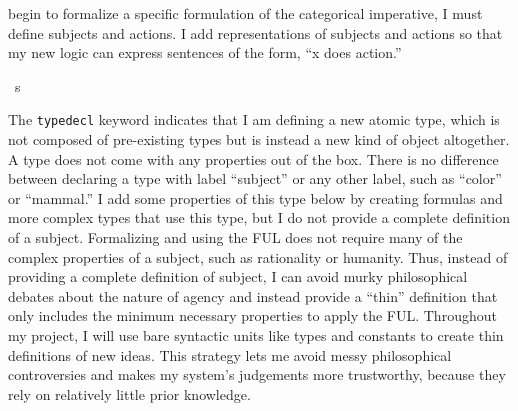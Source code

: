 \begin{isabellebody}
\begin{isamarkuptext}
begin to formalize a specific formulation of the categorical imperative, I must define
subjects and actions. I add representations of subjects and actions so that my new logic can express
sentences of the form, ``x does action.''%
\end{isamarkuptext}\isamarkuptrue%
\isamarkupfalse%
\ s\ %
%
\begin{isamarkuptext}%
The \texttt{typedecl} keyword indicates that I am defining a new atomic type, which is not composed
of pre-existing types but is instead a new kind of object altogether. A type does not come with any 
properties out of the box. There is no difference between declaring a type with label ``subject'' or any other
label, such as ``color'' or ``mammal.'' I add some properties of this type below by creating formulas
and more complex types that use this type, but I do not provide a complete definition of a subject.
Formalizing and using the FUL does not require many of the complex properties of a subject, such as 
rationality or humanity. Thus, instead of providing a complete definition of subject, I can avoid murky
philosophical debates about the nature of agency and instead provide a 
``thin'' definition that only includes the minimum necessary properties to apply the FUL. Throughout my 
project, I will use bare syntactic units like types and constants to create thin definitions of new ideas.
This strategy lets me avoid messy philosophical controversies and makes my system's judgements more 
trustworthy, because they rely on relatively little prior knowledge.


\end{isamarkuptext}
\end{isabellebody}
